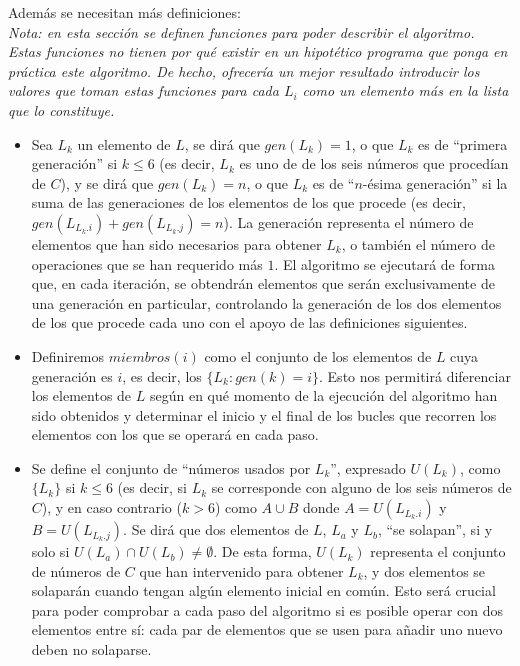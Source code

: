 \documentclass{article}
\begin{document}
Además se necesitan más definiciones:\\
\emph{Nota: en esta sección se definen funciones para poder describir el algoritmo. Estas funciones no tienen por qué existir en un hipotético programa que ponga en práctica este algoritmo. De hecho, ofrecería un mejor resultado introducir los valores que toman estas funciones para cada $L_i$ como un elemento más en la lista que lo constituye.}
\begin{itemize}
	\item Sea $L_k$ un elemento de $L$, se dirá que $gen(L_k) = 1$, o que $L_k$ es de ``primera generación'' si $k \le 6$ (es decir, $L_k$ es uno de de los seis números que procedían de $C$), y se dirá que $gen(L_k) = n$, o que $L_k$ es de ``$n$-ésima generación'' si la suma de las generaciones de los elementos de los que procede (es decir, $gen(L_{L_k.i}) + gen(L_{L_k.j}) = n$). La generación representa el número de elementos que han sido necesarios para obtener $L_k$, o también el número de operaciones que se han requerido más $1$. El algoritmo se ejecutará de forma que, en cada iteración, se obtendrán elementos que serán exclusivamente de una generación en particular, controlando la generación de los dos elementos de los que procede cada uno con el apoyo de las definiciones siguientes.

	\item Definiremos $miembros(i)$ como el conjunto de los elementos de $L$ cuya generación es $i$, es decir, los $\{L_k : gen(k) = i\}$. Esto nos permitirá diferenciar los elementos de $L$ según en qué momento de la ejecución del algoritmo han sido obtenidos y determinar el inicio y el final de los bucles que recorren los elementos con los que se operará en cada paso.

	\item Se define el conjunto de ``números usados por $L_k$'', expresado $U(L_k)$, como $\{L_k\}$ si $k \le 6$ (es decir, si $L_k$ se corresponde con alguno de los seis números de $C$), y en caso contrario ($k > 6$) como $A \cup B$ donde $A =U(L_{L_k.i})$ y $B = U(L_{L_k.j})$. Se dirá que dos elementos de $L$, $L_a$ y $L_b$, ``se solapan'', si y solo si $U(L_a) \cap  U(L_b) \ne \emptyset$. De esta forma, $U(L_k)$ representa el conjunto de números de $C$ que han intervenido para obtener $L_k$, y dos elementos se solaparán cuando tengan algún elemento inicial en común. Esto será crucial para poder comprobar a cada paso del algoritmo si es posible operar con dos elementos entre sí: cada par de elementos que se usen para añadir uno nuevo deben no solaparse.

\end{itemize}
\end{document}
